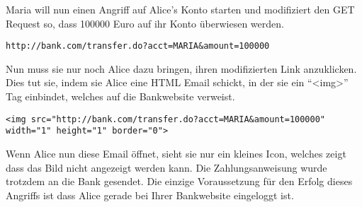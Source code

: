 Maria will nun einen Angriff auf Alice's Konto starten und modifiziert den GET Request so, dass 100000 Euro auf ihr Konto \"uberwiesen werden.

\begin{lstlisting}[caption = Modifizierter GET Request]
http://bank.com/transfer.do?acct=MARIA&amount=100000
\end{lstlisting}

Nun muss sie nur noch Alice dazu bringen, ihren modifizierten Link anzuklicken. Dies tut sie, indem sie Alice eine HTML Email schickt, in der sie ein ``<img>'' Tag einbindet, welches auf die Bankwebsite verweist.

\begin{lstlisting}[caption = IMG Tags f\"ur eine HTML Email]
<img src="http://bank.com/transfer.do?acct=MARIA&amount=100000" width="1" height="1" border="0">
\end{lstlisting}

Wenn Alice nun diese Email \"offnet, sieht sie nur ein kleines Icon, welches zeigt dass das Bild nicht angezeigt werden kann. Die Zahlungsanweisung wurde trotzdem an die Bank gesendet. Die einzige Voraussetzung f\"ur den Erfolg dieses Angriffs ist dass Alice gerade bei Ihrer Bankwebsite eingeloggt ist.

\cite{owaspCSRF}